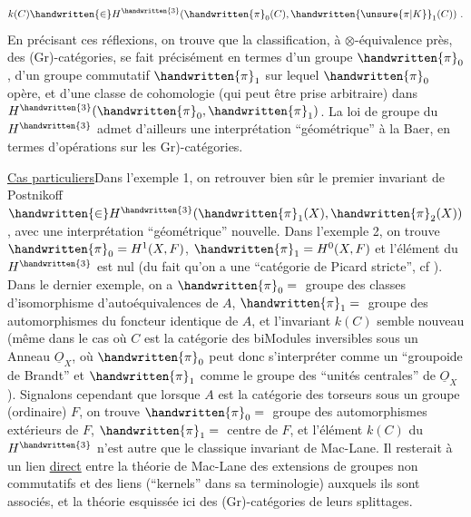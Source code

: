 \[
k(C)\handwritten{\in}H^{\handwritten{3}}(\handwritten{\pi}_{0}(C),\handwritten{\unsure{\pi|K}}_{1}(C))\ .
\]
En précisant ces réflexions, on trouve que la classification, à $\otimes$-équivalence près, des (Gr)-catégories, se fait précisément en termes d'un groupe $\handwritten{\pi}_{0}$, d'un groupe commutatif $\handwritten{\pi}_{1}$ sur lequel $\handwritten{\pi}_{0}$ opère, et d'une classe de cohomologie (qui peut être prise arbitraire) dans $H^{\handwritten{3}}(\handwritten{\pi}_{0},\handwritten{\pi}_{1})$. La loi de  groupe du $H^{\handwritten{3}}$ admet d'ailleurs une interprétation ``géométrique'' à la Baer, en termes d'opérations sur les \handwritten{(}Gr)-catégories.

\uline{Cas particuliers}\quad Dans l'exemple 1, on  retrouver bien sûr le premier invariant de Postnikoff $\handwritten{\in}H^{\handwritten{3}}(\handwritten{\pi}_{1}(X),\handwritten{\pi}_{2}(X))$, avec une interprétation ``géo\deleted{\unsure{(}}métrique'' nouvelle. Dans l'exemple 2, on trouve $\handwritten{\pi}_{0}=H^{1}(X,F)$, $\handwritten{\pi}_{1}=H^{0}(X,F)$\handwritten{,} et l'élément du $H^{\handwritten{3}}$ est nul (du fait qu'on a une ``catégorie de Picard stricte'', cf \handwritten{[\, ]}). Dans  le dernier exemple, on a $\handwritten{\pi}_{0}={}$ groupe des classes d'isomorphisme d'autoéquivalences de $A$, $\handwritten{\pi}_{1}={}$ groupe des automorphismes du foncteur identique de $A$, et l'invariant $k(C)$ semble nouveau (même dans le cas où $C$ est la catégorie des biModules inversibles sous un Anneau $\underline{O}_{X}$, où $\handwritten{\pi}_{0}$ peut donc s'interpréter comme un ``groupoide de Brandt'' et $\handwritten{\pi}_{1}$ comme le groupe des ``unités centrales'' de $\underline{O}_{X}$). Signalons cependant que lorsque $A$ est la catégorie des torseurs sous un groupe (ordinaire) $F$, on trouve  $\handwritten{\pi}_{0}={}$ groupe des automorphismes extérieurs de $F$, $\handwritten{\pi}_{1}={}$ centre de $F$, et l'élément $k(C)$ du $H^{\handwritten{3}}$ n'est autre que le classique invariant de Mac-Lane. Il resterait à  un lien  \uline{direct} entre la théorie de Mac-Lane des extensions de groupes non commutatifs et des liens (``kernels''\deleted{\unsure{)|,}} dans sa terminologie) auxquels ils sont associés, et la théorie  esquissée ici des (Gr)-catégories  de leurs splittages.

